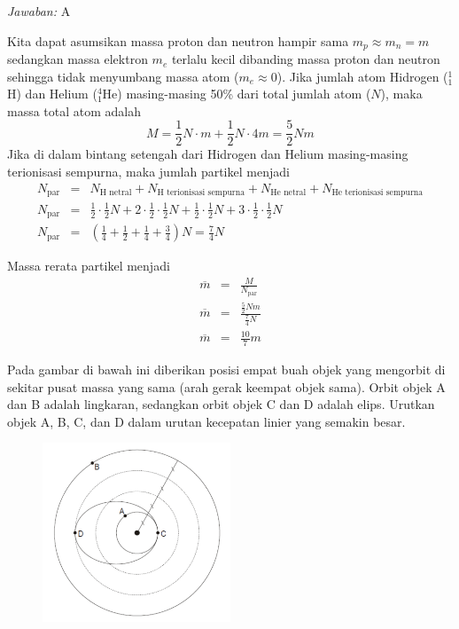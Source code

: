 \documentclass[11pt,fleqn]{exam}
\begin{document}
\begin{questions}
\bigskip
\textit{Jawaban: } A

Kita dapat asumsikan massa proton dan neutron hampir sama $m_p \approx m_n = m$ sedangkan massa elektron $m_e$ terlalu kecil dibanding massa proton dan neutron sehingga tidak menyumbang massa atom ($m_e \approx 0$). Jika jumlah atom Hidrogen ($^{1}_{1}$H) dan Helium ($^4_1$He) masing-masing 50\% dari total jumlah atom ($N$), maka massa total atom adalah 
$$M = \frac{1}{2} N \cdot m + \frac{1}{2} N \cdot 4 m = \frac{5}{2} N m$$
Jika di dalam bintang setengah dari Hidrogen dan Helium masing-masing terionisasi sempurna, maka jumlah partikel menjadi
\begin{eqnarray*}
    N_{\text{par}} &=& N_\text{H netral} + N_\text{H terionisasi sempurna} + N_\text{He netral} + N_\text{He terionisasi sempurna}\\
    N_{\text{par}} &=& \frac{1}{2} \cdot \frac{1}{2} N + 2 \cdot \frac{1}{2} \cdot \frac{1}{2} N + \frac{1}{2} \cdot \frac{1}{2} N + 3 \cdot \frac{1}{2} \cdot \frac{1}{2} N \\
    N_{\text{par}} &=& \left(\frac{1}{4} + \frac{1}{2} + \frac{1}{4} + \frac{3}{4}\right) N = \frac{7}{4} N 
\end{eqnarray*}

Massa rerata partikel menjadi
\begin{eqnarray*}
    \overline{m} &=& \frac{M}{N_{\text{par}}}\\
    \overline{m} &=& \frac{\frac{5}{2} N m}{\frac{7}{4} N}\\
    \overline{m} &=& \frac{10}{7} m 
\end{eqnarray*}


\vspace{0.5cm}
\question Pada gambar di bawah ini diberikan posisi empat buah objek yang mengorbit di sekitar pusat massa yang sama (arah gerak keempat objek sama). Orbit objek A dan B adalah lingkaran, sedangkan orbit objek C dan D adalah elips. Urutkan objek A, B, C, dan D dalam urutan kecepatan linier yang semakin besar.
\begin{figure}[H]
\centering
\includegraphics[width=0.5\textwidth]{osp2022_6.png}
\label{fig:osp2022_6}
\end{figure}


\end{questions}
\end{document}
